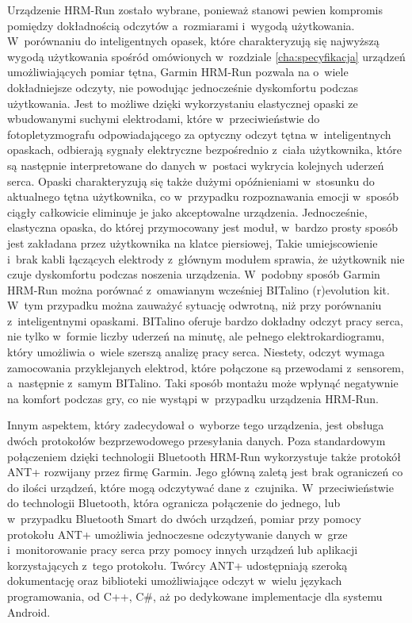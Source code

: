 Urządzenie HRM-Run zostało wybrane, ponieważ stanowi pewien kompromis pomiędzy dokładnością odczytów a~rozmiarami i~wygodą użytkowania. W~porównaniu do inteligentnych opasek, które charakteryzują się najwyższą wygodą użytkowania spośród omówionych w~rozdziale \ref{cha:specyfikacja} urządzeń umożliwiających pomiar tętna, Garmin HRM-Run pozwala na o~wiele dokładniejsze odczyty, nie powodując jednocześnie dyskomfortu podczas użytkowania. Jest to możliwe dzięki wykorzystaniu elastycznej opaski ze wbudowanymi suchymi elektrodami, które w~przeciwieństwie do fotopletyzmografu odpowiadającego za optyczny odczyt tętna w~inteligentnych opaskach, odbierają sygnały elektryczne bezpośrednio z~ciała użytkownika, które są następnie interpretowane do danych w~postaci wykrycia kolejnych uderzeń serca. Opaski charakteryzują się także dużymi opóźnieniami w~stosunku do aktualnego tętna użytkownika, co w~przypadku rozpoznawania emocji w~sposób ciągły całkowicie eliminuje je jako akceptowalne urządzenia. Jednocześnie, elastyczna opaska, do której przymocowany jest moduł, w~bardzo prosty sposób jest zakładana przez użytkownika na klatce piersiowej, Takie umiejscowienie i~brak kabli łączących elektrody z~głównym modułem sprawia, że użytkownik nie czuje dyskomfortu podczas noszenia urządzenia. W~podobny sposób Garmin HRM-Run można porównać z~omawianym wcześniej BITalino (r)evolution kit. W~tym przypadku można zauważyć sytuację odwrotną, niż przy porównaniu z~inteligentnymi opaskami. BITalino oferuje bardzo dokładny odczyt pracy serca, nie tylko w~formie liczby uderzeń na minutę, ale pełnego elektrokardiogramu, który umożliwia o~wiele szerszą analizę pracy serca. Niestety, odczyt wymaga zamocowania przyklejanych elektrod, które połączone są przewodami z~sensorem, a~następnie z~samym BITalino. Taki sposób montażu może wpłynąć negatywnie na komfort podczas gry, co nie wystąpi w~przypadku urządzenia HRM-Run.

Innym aspektem, który zadecydował o~wyborze tego urządzenia, jest obsługa dwóch protokołów bezprzewodowego przesyłania danych. Poza standardowym połączeniem dzięki technologii Bluetooth HRM-Run wykorzystuje także protokół ANT+ rozwijany przez firmę Garmin. Jego główną zaletą jest brak ograniczeń co do ilości urządzeń, które mogą odczytywać dane z~czujnika. W~przeciwieństwie do technologii Bluetooth, która ogranicza połączenie do jednego, lub w~przypadku Bluetooth Smart do dwóch urządzeń, pomiar przy pomocy protokołu ANT+ umożliwia jednoczesne odczytywanie danych w~grze i~monitorowanie pracy serca przy pomocy innych urządzeń lub aplikacji korzystających z~tego protokołu. Twórcy ANT+ udostępniają szeroką dokumentację oraz biblioteki umożliwiające odczyt w~wielu językach programowania, od C++, C\#, aż po dedykowane implementacje dla systemu Android.

